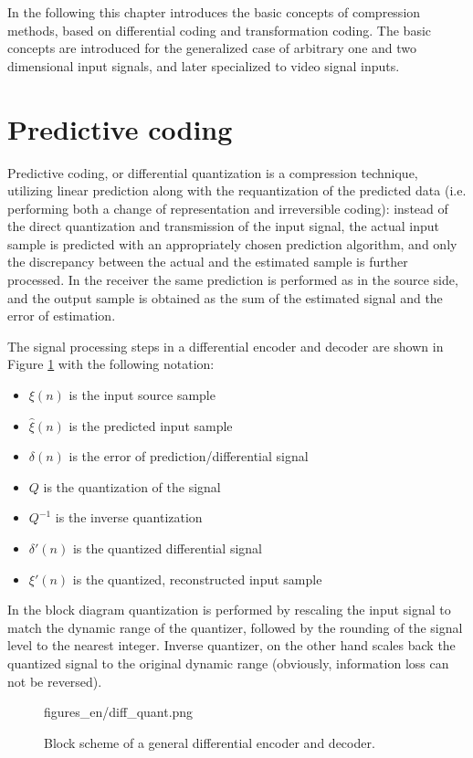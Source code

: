 In the following this chapter introduces the basic concepts of compression methods, based on differential coding and transformation coding.
The basic concepts are introduced for the generalized case of arbitrary one and two dimensional input signals, and later specialized to video signal inputs.

\section{Predictive coding}

Predictive coding, or differential quantization is a compression technique, utilizing linear prediction along with the requantization of the predicted data (i.e. performing both a change of representation and irreversible coding):
instead of the direct quantization and transmission of the input signal, the actual input sample is predicted with an appropriately chosen prediction algorithm, and only the discrepancy between the actual and the estimated sample is further processed.
In the receiver the same prediction is performed as in the source side, and the output sample is obtained as the sum of the estimated signal and the error of estimation. 

The signal processing steps in a differential encoder and decoder are shown in Figure \ref{Fig:diff_quant} with the following notation:
\begin{itemize}
\item $\xi(n)$ is the input source sample
\item $\hat{\xi}(n)$ is the predicted input sample
\item $\delta(n)$ is the error of prediction/differential signal
\item $Q$ is the quantization of the signal
\item $Q^{-1}$ is the inverse quantization
\item $\delta'(n)$ is the quantized differential signal
\item $\xi'(n)$ is the quantized, reconstructed input sample
\end{itemize}
In the block diagram quantization is performed by rescaling the input signal to match the dynamic range of the quantizer, followed by the rounding of the signal level to the nearest integer.
Inverse quantizer, on the other hand scales back the quantized signal to the original dynamic range (obviously, information loss can not be reversed).

\begin{figure}[]
	\centering
	\begin{overpic}[width = 0.6\columnwidth ]{figures_en/diff_quant.png}
	\end{overpic}
	\caption{Block scheme of a general differential encoder and decoder.}
	\label{Fig:diff_quant}
\end{figure}

